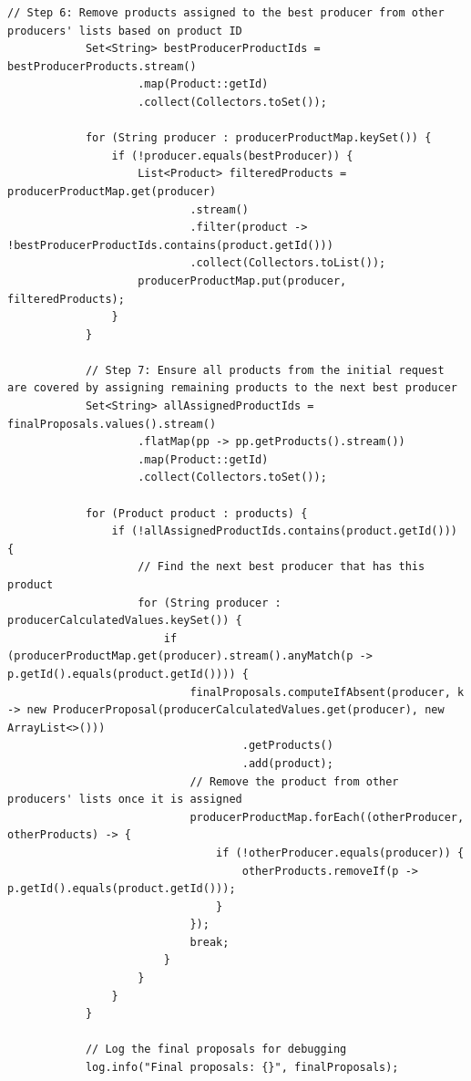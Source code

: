 \begin{lstlisting}[caption=Kod klasy ProposalService, label=ProposalServiceCode]
            // Step 6: Remove products assigned to the best producer from other producers' lists based on product ID
            Set<String> bestProducerProductIds = bestProducerProducts.stream()
                    .map(Product::getId)
                    .collect(Collectors.toSet());
    
            for (String producer : producerProductMap.keySet()) {
                if (!producer.equals(bestProducer)) {
                    List<Product> filteredProducts = producerProductMap.get(producer)
                            .stream()
                            .filter(product -> !bestProducerProductIds.contains(product.getId()))
                            .collect(Collectors.toList());
                    producerProductMap.put(producer, filteredProducts);
                }
            }
    
            // Step 7: Ensure all products from the initial request are covered by assigning remaining products to the next best producer
            Set<String> allAssignedProductIds = finalProposals.values().stream()
                    .flatMap(pp -> pp.getProducts().stream())
                    .map(Product::getId)
                    .collect(Collectors.toSet());
    
            for (Product product : products) {
                if (!allAssignedProductIds.contains(product.getId())) {
                    // Find the next best producer that has this product
                    for (String producer : producerCalculatedValues.keySet()) {
                        if (producerProductMap.get(producer).stream().anyMatch(p -> p.getId().equals(product.getId()))) {
                            finalProposals.computeIfAbsent(producer, k -> new ProducerProposal(producerCalculatedValues.get(producer), new ArrayList<>()))
                                    .getProducts()
                                    .add(product);
                            // Remove the product from other producers' lists once it is assigned
                            producerProductMap.forEach((otherProducer, otherProducts) -> {
                                if (!otherProducer.equals(producer)) {
                                    otherProducts.removeIf(p -> p.getId().equals(product.getId()));
                                }
                            });
                            break;
                        }
                    }
                }
            }
    
            // Log the final proposals for debugging
            log.info("Final proposals: {}", finalProposals);
    

\end{lstlisting}
